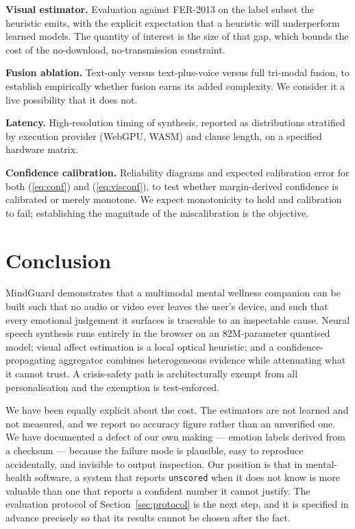 \documentclass[conference]{IEEEtran}
\begin{document}
\textbf{Visual estimator.} Evaluation against FER-2013 \cite{fer2013} on the
label subset the heuristic emits, with the explicit expectation that a
heuristic will underperform learned models. The quantity of interest is the
size of that gap, which bounds the cost of the no-download, no-transmission
constraint.

\textbf{Fusion ablation.} Text-only versus text-plus-voice versus full
tri-modal fusion, to establish empirically whether fusion earns its added
complexity. We consider it a live possibility that it does not.

\textbf{Latency.} High-resolution timing of synthesis, reported as
distributions stratified by execution provider (WebGPU, WASM) and clause
length, on a specified hardware matrix.

\textbf{Confidence calibration.} Reliability diagrams and expected calibration
error for both (\ref{eq:conf}) and (\ref{eq:visconf}), to test whether
margin-derived confidence is calibrated or merely monotone. We expect
monotonicity to hold and calibration to fail; establishing the magnitude of
the miscalibration is the objective.

\section{Conclusion}

MindGuard demonstrates that a multimodal mental wellness companion can be
built such that no audio or video ever leaves the user's device, and such that
every emotional judgement it surfaces is traceable to an inspectable cause.
Neural speech synthesis runs entirely in the browser on an 82M-parameter
quantised model; visual affect estimation is a local optical heuristic; and a
confidence-propagating aggregator combines heterogeneous evidence while
attenuating what it cannot trust. A crisis-safety path is architecturally
exempt from all personalisation and the exemption is test-enforced.

We have been equally explicit about the cost. The estimators are not learned
and not measured, and we report no accuracy figure rather than an unverified
one. We have documented a defect of our own making --- emotion labels derived
from a checksum --- because the failure mode is plausible, easy to reproduce
accidentally, and invisible to output inspection. Our position is that in
mental-health software, a system that reports \texttt{unscored} when it does
not know is more valuable than one that reports a confident number it cannot
justify. The evaluation protocol of Section~\ref{sec:protocol} is the next
step, and it is specified in advance precisely so that its results cannot be
chosen after the fact.
\end{document}
